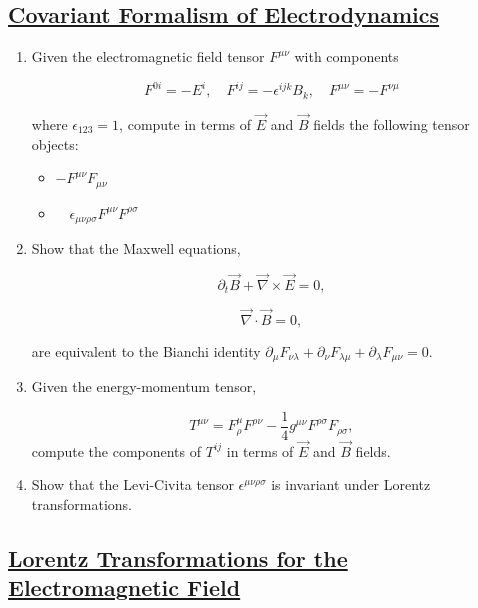 \subsection{\hyperref[Covariant formalism of Electrodynamics]{Covariant Formalism of Electrodynamics}}

\begin{enumerate}
	\item Given the electromagnetic field tensor $F^{\mu \nu}$ with components
	
	\begin{equation}
	F^{0 i}=-E^{i}, \quad F^{i j}=-\epsilon^{i j k} B_{k}, \quad F^{\mu \nu}=-F^{\nu \mu}
	\end{equation}

	where $\epsilon_{123}=1$, compute in terms of $\vec{E}$ and $\vec{B}$ fields the following tensor objects:

	\begin{itemize}
		\item $-F^{\mu \nu} F_{\mu \nu}$
		\item $\quad \epsilon_{\mu \nu \rho \sigma} F^{\mu \nu} F^{\rho \sigma}$
	\end{itemize}

	\item Show that the Maxwell equations,
	
	\begin{equation}
		\partial_{t}\vec{B} + \vec{\nabla}\times \vec{E}=0,
	\end{equation}

	\begin{equation}
		\vec{\nabla}\cdot \vec{B}=0,
	\end{equation}

	are equivalent to the Bianchi identity $\partial_{\mu} F_{\nu\lambda} + \partial_{\nu} F_{\lambda\mu} +\partial_{\lambda} F_{\mu\nu}=0$.
	\item Given the energy-momentum tensor,
	
	\begin{equation}
		T^{\mu\nu}= F^{\mu}_{\rho}F^{\rho \nu} - \frac{1}{4}g^{\mu\nu}F^{\rho\sigma}F_{\rho\sigma},
	\end{equation}
	compute the components of $T^{ij}$ in terms of $\vec{E}$ and $\vec{B}$ fields.
	\item Show that the Levi-Civita tensor $\epsilon^{\mu \nu \rho \sigma}$ is invariant under Lorentz transformations.
\end{enumerate}

\subsection{\hyperref[Lorentz Transformations for the Electromagnetic Field]{Lorentz Transformations for the Electromagnetic Field}}

